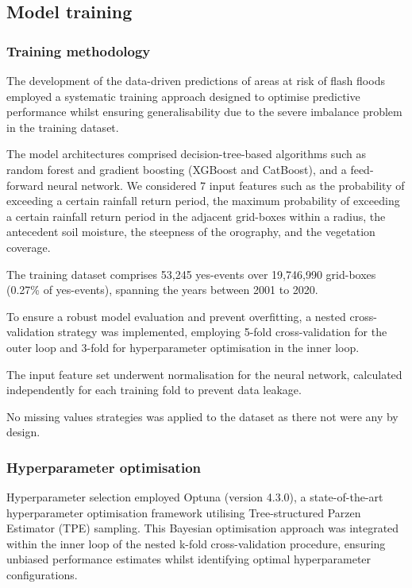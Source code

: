 \subsection{Model training}

\subsubsection{Training methodology}

The development of the data-driven predictions of areas at risk of flash floods employed a systematic training approach designed to optimise predictive performance whilst ensuring generalisability due to the severe imbalance problem in the training dataset. 

The model architectures comprised decision-tree-based algorithms such as random forest and gradient boosting (XGBoost and CatBoost), and a feed-forward neural network. We considered 7 input features such as the probability of exceeding a certain rainfall return period, the maximum probability of exceeding a certain rainfall return period in the adjacent grid-boxes within a radius, the antecedent soil moisture, the steepness of the orography, and the vegetation coverage. 

The training dataset comprises 53,245 yes-events over 19,746,990 grid-boxes (0.27\% of yes-events), spanning the years between 2001 to 2020. 

To ensure a robust model evaluation and prevent overfitting, a nested cross-validation strategy was implemented, employing 5-fold cross-validation for the outer loop and 3-fold for hyperparameter optimisation in the inner loop. 

The input feature set underwent normalisation for the neural network, calculated independently for each training fold to prevent data leakage.

No missing values strategies was applied to the dataset as there not were any by design.


\subsubsection{Hyperparameter optimisation}

Hyperparameter selection employed Optuna (version 4.3.0), a state-of-the-art hyperparameter optimisation framework utilising Tree-structured Parzen Estimator (TPE) sampling. This Bayesian optimisation approach was integrated within the inner loop of the nested k-fold cross-validation procedure, ensuring unbiased performance estimates whilst identifying optimal hyperparameter configurations.

